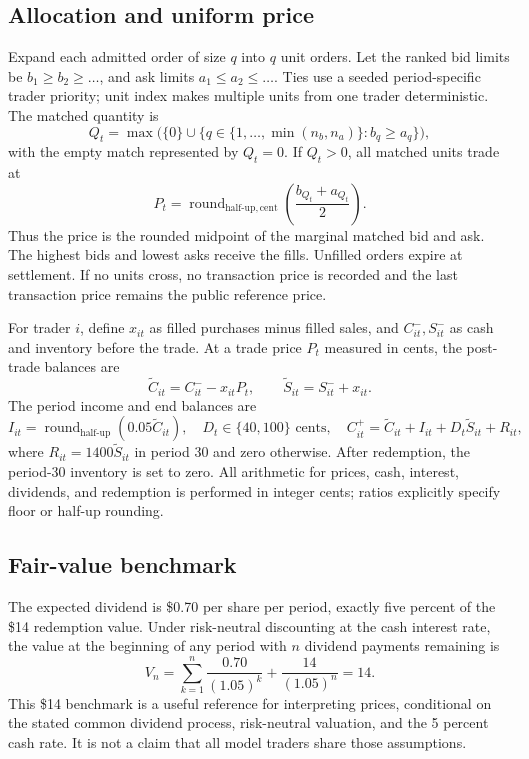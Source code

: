 \documentclass[11pt]{article}
\begin{document}
\subsection{Allocation and uniform price}
Expand each admitted order of size \(q\) into \(q\) unit orders. Let the ranked
bid limits be \(b_1\ge b_2\ge\dots\), and ask limits \(a_1\le a_2\le\dots\).
Ties use a seeded period-specific trader priority; unit index makes multiple
units from one trader deterministic. The matched quantity is
\[
  Q_t=\max\bigl(\{0\}\cup\{q\in\{1,\ldots,\min(n_b,n_a)\}:b_q\ge a_q\}\bigr),
\]
with the empty match represented by \(Q_t=0\). If \(Q_t>0\), all matched
units trade at
\[
  P_t=\operatorname{round}_{\text{half-up},\,\text{cent}}\!\left(
       \frac{b_{Q_t}+a_{Q_t}}{2}\right).
\]
Thus the price is the rounded midpoint of the marginal matched bid and ask.
The highest bids and lowest asks receive the fills. Unfilled orders expire at
settlement. If no units cross, no transaction price is recorded and the last
transaction price remains the public reference price.

For trader \(i\), define \(x_{it}\) as filled purchases minus filled sales,
and \(C^-_{it},S^-_{it}\) as cash and inventory before the trade. At a trade
price \(P_t\) measured in cents, the post-trade balances are
\[
  \widetilde C_{it}=C^-_{it}-x_{it}P_t,\qquad
  \widetilde S_{it}=S^-_{it}+x_{it}.
\]
The period income and end balances are
\[
  I_{it}=\operatorname{round}_{\text{half-up}}(0.05\widetilde C_{it}),\quad
  D_t\in\{40,100\}\text{ cents},\quad
  C^+_{it}=\widetilde C_{it}+I_{it}+D_t\widetilde S_{it}+R_{it},
\]
where \(R_{it}=1400\widetilde S_{it}\) in period 30 and zero otherwise.
After redemption, the period-30 inventory is set to zero. All arithmetic for
prices, cash, interest, dividends, and redemption is performed in integer
cents; ratios explicitly specify floor or half-up rounding.

\subsection{Fair-value benchmark}
The expected dividend is \$0.70 per share per period, exactly five percent of
the \$14 redemption value. Under risk-neutral discounting at the cash interest
rate, the value at the beginning of any period with \(n\) dividend payments
remaining is
\[
  V_n=\sum_{k=1}^{n}\frac{0.70}{(1.05)^k}
      +\frac{14}{(1.05)^n}=14.
\]
This \$14 benchmark is a useful reference for interpreting prices, conditional
on the stated common dividend process, risk-neutral valuation, and the 5 percent
cash rate. It is not a claim that all model traders share those assumptions.
\end{document}
